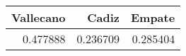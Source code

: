 \begin{tabular}{rrr}
\hline
   Vallecano &    Cadiz &   Empate \\
\hline
    0.477888 & 0.236709 & 0.285404 \\
\hline
\end{tabular}